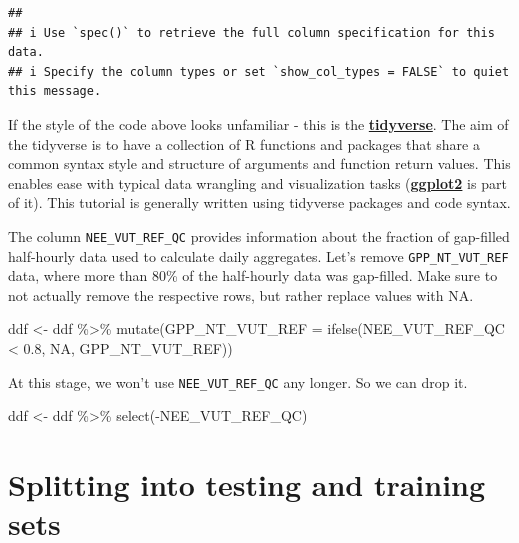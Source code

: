 \documentclass[
]{book}
\newenvironment{Shaded}{\begin{snugshade}}{\end{snugshade}}
\newcommand{\AttributeTok}[1]{\textcolor[rgb]{0.77,0.63,0.00}{#1}}
\newcommand{\ConstantTok}[1]{\textcolor[rgb]{0.00,0.00,0.00}{#1}}
\newcommand{\FloatTok}[1]{\textcolor[rgb]{0.00,0.00,0.81}{#1}}
\newcommand{\FunctionTok}[1]{\textcolor[rgb]{0.00,0.00,0.00}{#1}}
\newcommand{\NormalTok}[1]{#1}
\newcommand{\OtherTok}[1]{\textcolor[rgb]{0.56,0.35,0.01}{#1}}
\newcommand{\SpecialCharTok}[1]{\textcolor[rgb]{0.00,0.00,0.00}{#1}}
\begin{document}
\begin{verbatim}
## 
## i Use `spec()` to retrieve the full column specification for this data.
## i Specify the column types or set `show_col_types = FALSE` to quiet this message.
\end{verbatim}

If the style of the code above looks unfamiliar - this is the \textbf{\href{https://www.tidyverse.org/}{tidyverse}}. The aim of the tidyverse is to have a collection of R functions and packages that share a common syntax style and structure of arguments and function return values. This enables ease with typical data wrangling and visualization tasks (\textbf{\href{https://ggplot2.tidyverse.org/}{ggplot2}} is part of it). This tutorial is generally written using tidyverse packages and code syntax.

The column \texttt{NEE\_VUT\_REF\_QC} provides information about the fraction of gap-filled half-hourly data used to calculate daily aggregates. Let's remove \texttt{GPP\_NT\_VUT\_REF} data, where more than 80\% of the half-hourly data was gap-filled. Make sure to not actually remove the respective rows, but rather replace values with NA.

\begin{Shaded}
\begin{Highlighting}[]
\NormalTok{ddf }\OtherTok{\textless{}{-}}\NormalTok{ ddf }\SpecialCharTok{\%\textgreater{}\%} 
  \FunctionTok{mutate}\NormalTok{(}\AttributeTok{GPP\_NT\_VUT\_REF =} \FunctionTok{ifelse}\NormalTok{(NEE\_VUT\_REF\_QC }\SpecialCharTok{\textless{}} \FloatTok{0.8}\NormalTok{, }\ConstantTok{NA}\NormalTok{, GPP\_NT\_VUT\_REF))}
\end{Highlighting}
\end{Shaded}

At this stage, we won't use \texttt{NEE\_VUT\_REF\_QC} any longer. So we can drop it.

\begin{Shaded}
\begin{Highlighting}[]
\NormalTok{ddf }\OtherTok{\textless{}{-}}\NormalTok{ ddf }\SpecialCharTok{\%\textgreater{}\%} 
  \FunctionTok{select}\NormalTok{(}\SpecialCharTok{{-}}\NormalTok{NEE\_VUT\_REF\_QC)}
\end{Highlighting}
\end{Shaded}

\hypertarget{splitting-into-testing-and-training-sets}{%
\section{Splitting into testing and training sets}\label{splitting-into-testing-and-training-sets}}
\end{document}
